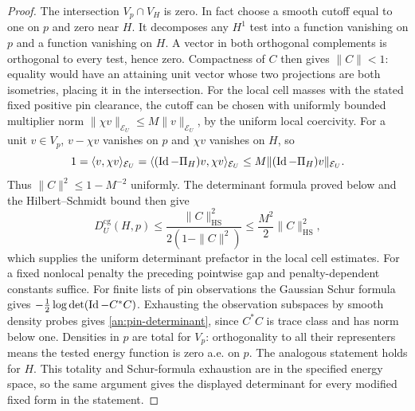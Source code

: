 \begin{proof}
The intersection $V_p\cap V_H$ is zero.  In
fact choose a smooth cutoff equal to one on
$p$ and zero near $H$.  It decomposes any
$H^1$ test into a function vanishing on $p$
and a function vanishing on $H$.  A vector in
both orthogonal complements is orthogonal to
every test, hence zero.  Compactness of $C$
then gives $\|C\|<1$: equality would have an
attaining unit vector whose two projections
are both isometries, placing it in the
intersection.  For the local cell masses with the stated fixed
positive pin clearance, the cutoff can be chosen with uniformly
bounded multiplier norm
$\|\chi v\|_{\mathcal E_U}\le M\|v\|_{\mathcal E_U}$,
by the uniform local coercivity.  For a unit $v\in V_p$,
$v-\chi v$ vanishes on $p$ and $\chi v$ vanishes on $H$, so
\[
 1=\langle v,\chi v\rangle_{\mathcal E_U}
   =\langle(\operatorname{Id}-\Pi_H)v,\chi v\rangle_{\mathcal E_U}
   \le M\|(\operatorname{Id}-\Pi_H)v\|_{\mathcal E_U}.
\]
Thus $\|C\|^2\le1-M^{-2}$ uniformly.  The determinant formula
proved below and the Hilbert--Schmidt bound then give
\[
 D_U^{\mathrm{cg}}(H,p)
 \le\frac{\|C\|_{\mathrm{HS}}^2}{2(1-\|C\|^2)}
 \le\frac{M^2}{2}\|C\|_{\mathrm{HS}}^2,
\]
which supplies the uniform determinant prefactor in the local
cell estimates.  For a fixed nonlocal penalty the preceding
pointwise gap and penalty-dependent constants suffice.
For finite lists of pin
observations the Gaussian Schur formula gives
$-\frac12\log\det(\operatorname{Id}-C^*C)$.  Exhausting
the observation subspaces by smooth density
probes gives \eqref{an:pin-determinant}, since
$C^*C$ is trace class and has norm below one.
Densities in $p$ are total for $V_p$:
orthogonality to all their representers means
the tested energy function is zero a.e. on
$p$.  The analogous statement holds for $H$.  This totality and
Schur-formula exhaustion are in the specified energy space, so
the same argument gives the displayed determinant for every
modified fixed form in the statement.


\end{proof}
